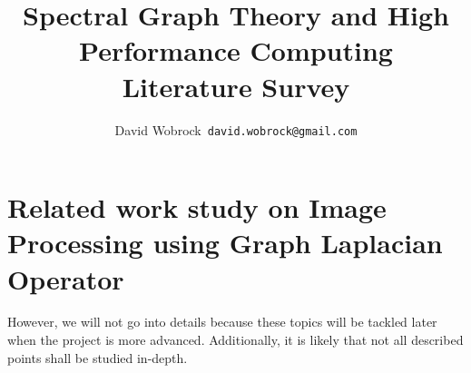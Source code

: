 \documentclass[]{article}
\title{Spectral Graph Theory and High Performance Computing \\ Literature Survey}
\author{David Wobrock\ \texttt{david.wobrock@gmail.com}}
\begin{document}
\maketitle

\section{Related work study on Image Processing using Graph Laplacian Operator}




However, we will not go into details because these topics will be tackled later when the project is more advanced.
Additionally, it is likely that not all described points shall be studied in-depth.

\clearpage
\printbibliography
\end{document}
